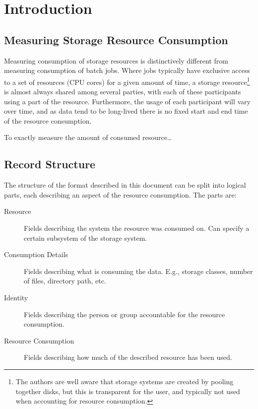\section{Introduction}


\subsection{Measuring Storage Resource Consumption}

Measuring consumption of storage resources is distinctively different from
measuring consumption of batch jobs. Where jobs typically have exclusive access
to a set of resources (CPU cores) for a given amount of time, a storage
resource\footnote{The authors are well aware that storage systems are created
by pooling together disks, but this is transparent for the user, and typically
not used when accounting for resource consumption.} is almost always shared
among several parties, with each of these participants using a part of the
resource. Furthermore, the usage of each participant will vary over time, and as
data tend to be long-lived there is no fixed start and end time of the resource
consumption.

To exactly measure the amount of consumed resource\ldots



\subsection{Record Structure}

The structure of the format described in this document can be split into
logical parts, each describing an aspect of the resource consumption. The parts
are:

\begin{description}

\item[Resource] Fields describing the system the resource was consumed on. Can
specify a certain subsystem of the storage system.

\item[Consumption Details] Fields describing what is consuming the data. E.g.,
storage classes, number of files, directory path, etc.

\item[Identity] Fields describing the person or group accountable for the
resource consumption.

\item[Resource Consumption] Fields describing how much of the described
resource has been used.

\end{description}


